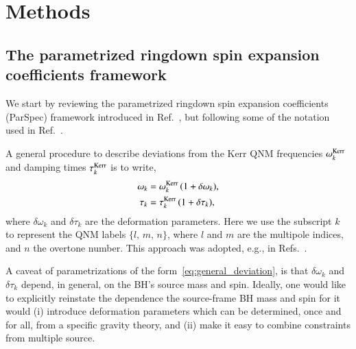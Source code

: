 \documentclass[twocolumn,
               prd,
               aps,
               superscriptaddress,
               tightenlines,
               nofootinbib,
               eqsecnum,
               amsfonts,
               amsmath,
               longbibliography]{revtex4-1}
\begin{document}
\section{Methods}
\label{sec:method}

\subsection{The parametrized ringdown spin expansion coefficients framework}
\label{sec:review_parspec}

We start by reviewing the parametrized ringdown spin expansion coefficients (ParSpec)
framework introduced in Ref.~\cite{Maselli:2019mjd}, but following
some of the notation used in Ref.~\cite{Carullo:2021dui}.

A general procedure to describe deviations from the Kerr QNM frequencies $\omega_{k}^{\rm Kerr}$ and
damping times $\tau_{k}^{\rm Kerr}$ is to write,
%
\begin{subequations}
\label{eq:general_deviation}
\begin{align}
\omega_{k} &= \omega^{\rm Kerr}_{k} \, (1 + \delta \omega_{k}), \\
\tau_{k}   &= \tau^{\rm Kerr}_{k}   \, (1 + \delta \tau_{k}),
\end{align}
\end{subequations}
%
where $\delta\omega_{k}$ and $\delta\tau_{k}$ are the deformation parameters.
%
Here we use the subscript $k$ to represent the QNM labels $\{l,\, m,\, n\}$,
where $l$ and $m$ are the multipole indices, and $n$ the overtone number.
%
This approach was adopted, e.g., in Refs.~\cite{Gossan:2011ha,Meidam:2014jpa,Carullo:2018sfu}.

A caveat of parametrizations of the form~\eqref{eq:general_deviation}, is that
$\delta\omega_{k}$ and $\delta\tau_{k}$ depend, in general, on the BH's source mass and spin.
%
Ideally, one would like to explicitly reinstate the dependence the source-frame
BH mass and spin for it would
%
%
(i) introduce deformation parameters which can be determined, once and for
all, from a specific gravity theory, and
%
(ii) make it easy to combine constraints from multiple source.
\end{document}
